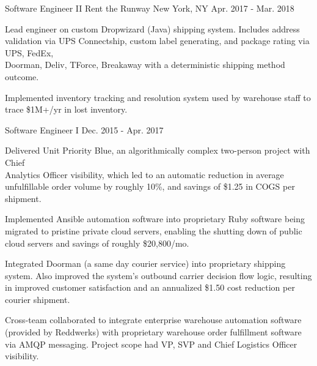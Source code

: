 
\begin{cventries}


  \cventry
    {Software Engineer II} %
    {Rent the Runway} %
    {New York, NY} %
    {Apr. 2017 - Mar. 2018} %
    {
      \begin{cvitems} %
        \item {Lead engineer on custom Dropwizard (Java) shipping system. Includes address validation via UPS Connectship, custom label generating, and package rating via UPS, FedEx, \\Doorman, Deliv, TForce, Breakaway with a deterministic shipping method outcome.}
        \item {Implemented inventory tracking and resolution system used by warehouse staff to trace \$1M+/yr in lost inventory.}
      \end{cvitems}
    }

  \cventry
    {Software Engineer I} %
    {} %
    {} %
    {Dec. 2015 - Apr. 2017} %
    {
      \begin{cvitems} %
        \item {Delivered Unit Priority Blue, an algorithmically complex two-person project with Chief \\Analytics Officer visibility, which led to an automatic reduction in average unfulfillable order volume by roughly 10\%, and savings of \$1.25 in COGS per shipment.}
        \item {Implemented Ansible automation software into proprietary Ruby software being migrated to pristine private cloud servers, enabling the shutting down of public cloud servers and savings of roughly \$20,800/mo.}
        \item {Integrated Doorman (a same day courier service) into proprietary shipping system. Also improved the system's outbound carrier decision flow logic, resulting in improved customer satisfaction and an annualized \$1.50 cost reduction per courier shipment.}
        \item {Cross-team collaborated to integrate enterprise warehouse automation software (provided by Reddwerks) with proprietary warehouse order fulfillment software via AMQP messaging. Project scope had VP, SVP and Chief Logistics Officer visibility.}
      \end{cvitems}
    }


\end{cventries}
